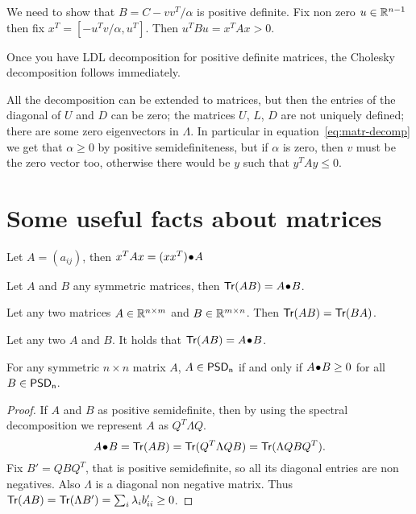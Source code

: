 \documentclass[a4paper,twoside,justified]{tufte-handout}
\begin{document}
We need to show that $B = C - vv^{T}/\alpha $ is positive definite. Fix
non zero $ u\in\mathbb{R}^{n-1} $ then fix $ x^{T}=[-u^{T}v/\alpha, u^{T}]
$. Then $ u^{T}Bu = x^{T}Ax > 0$.

Once you have LDL decomposition for positive definite matrices,
the Cholesky decomposition follows immediately.

All the decomposition can be extended to  matrices, but then the entries of the diagonal of $ U
$ and $D$ can be zero; the matrices $ U $, $ L $, $ D $ are not uniquely
defined; there are some zero eigenvectors in $ \Lambda $. In
particular in equation~\eqref{eq:matr-decomp} we get that $ \alpha
\geq 0 $ by positive semidefiniteness, but if $ \alpha $ is zero, then
$ v $ must be the zero vector too, otherwise there would be $ y $ such that
$ y^{T}Ay \leq 0 $.


\section{Some useful facts about matrices}

\begin{fact}
  Let $ A=(a_{ij}) $, then $x^{T}A x = {(xx^{T})}\!\bullet\!{A}$
\end{fact}

\begin{fact}
  Let $A$ and $B$ any symmetric matrices, then $
  \mathsf{Tr}(AB)={A}\!\bullet\!{B} $.
\end{fact}

\begin{fact}
  Let any two matrices $ A \in\mathbb{R}^{n\times m}$ and $ B \in\mathbb{R}^{m\times
    n} $. Then $ \mathsf{Tr}(AB)= \mathsf{Tr}(BA)$.
\end{fact}

\begin{fact}
  Let any two  $ A $ and $ B $. It holds that
  $ \mathsf{Tr}(AB)={A}\!\bullet\!{B} $.
\end{fact}

\begin{fact}\label{fact:positive_pointwise}
  For any symmetric $ n \times n $ matrix $ A $, $ A \in
  \mathsf{PSD_{n}} $ if and only if $ {A}\!\bullet\!{B}\geq 0
  $ for all $ B \in \mathsf{PSD_{n}} $.
\end{fact}
\begin{proof}
  If $ A $ and $ B $ as positive semidefinite, then by using the
  spectral decomposition we represent $ A $ as $Q^{T}\Lambda Q$.
  \begin{equation}
    {A}\!\bullet\!{B}=\mathsf{Tr}(AB)=\mathsf{Tr}(Q^{T}\Lambda Q B)
    =\mathsf{Tr}(\Lambda Q B Q^{T}). 
  \end{equation}
  Fix $ B' = Q B Q^{T} $, that is positive semidefinite, so all its
  diagonal entries are non negatives. Also $ \Lambda $ is a diagonal
  non negative matrix. Thus $
  \mathsf{Tr}(AB)=\mathsf{Tr}(\Lambda B')=\sum_{i}\lambda_{i}b'_{ii} \geq 0$.
\end{proof}
\end{document}
